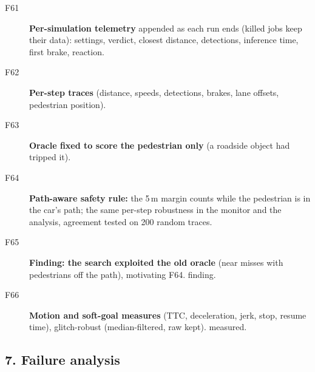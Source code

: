 \begin{description}
\item[F61] \textbf{Per-simulation telemetry} appended as each run ends (killed jobs keep their data): settings, verdict, closest distance, detections, inference time, first brake, reaction. \tagnew{} 
\item[F62] \textbf{Per-step traces} (distance, speeds, detections, brakes, lane offsets, pedestrian position). \tagnew{}
\item[F63] \textbf{Oracle fixed to score the pedestrian only} (a roadside object had tripped it). \tagnew{}
\item[F64] \textbf{Path-aware safety rule:} the 5\,m margin counts while the pedestrian is in the car's path; the same per-step robustness in the monitor and the analysis, agreement tested on 200 random traces. \tagnew{}
\item[F65] \textbf{Finding: the search exploited the old oracle} (near misses with pedestrians off the path), motivating F64. \tagnew{} finding.
\item[F66] \textbf{Motion and soft-goal measures} (TTC, deceleration, jerk, stop, resume time), glitch-robust (median-filtered, raw kept).  \tagnew{} measured.
\end{description}

\subsection*{7. Failure analysis}

